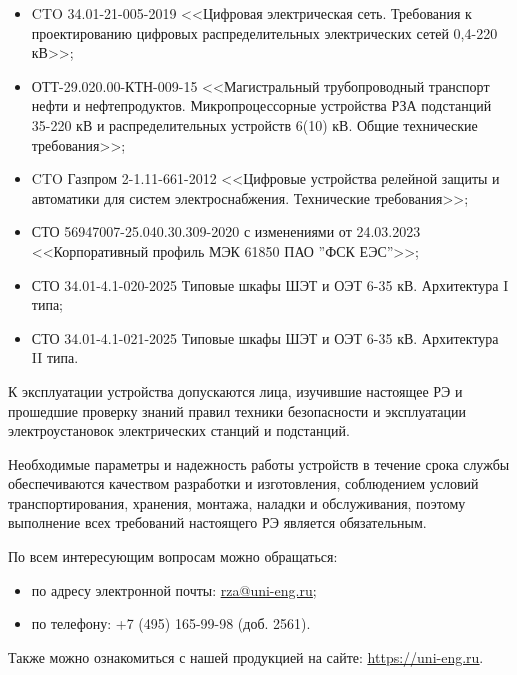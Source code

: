 \begin{itemize}
\item CTO 34.01-21-005-2019 <<Цифровая электрическая сеть. Требования к проектированию цифровых распределительных электрических сетей 0,4-220 кВ>>;
\item \sloppy ОТТ-29.020.00-КТН-009-15 <<Магистральный трубопроводный транспорт нефти и нефтепродуктов. Микропроцессорные устройства РЗА подстанций 35-220 кВ и распределительных устройств 6(10) кВ. Общие технические требования>>;
\item CTO Газпром 2-1.11-661-2012 <<Цифровые устройства релейной защиты и автоматики для систем электроснабжения. Технические требования>>;
\item СТО 56947007-25.040.30.309-2020 с изменениями от 24.03.2023 <<Корпоративный профиль МЭК 61850 ПАО ''ФСК ЕЭС''>>;
\item СТО 34.01-4.1-020-2025 Типовые шкафы ШЭТ и ОЭТ 6-35 кВ. Архитектура I типа;
\item СТО 34.01-4.1-021-2025 Типовые шкафы ШЭТ и ОЭТ 6-35 кВ. Архитектура II типа.

\end{itemize}

\par
К эксплуатации устройства допускаются лица, изучившие настоящее РЭ и прошедшие проверку знаний правил техники безопасности и эксплуатации электроустановок электрических станций и подстанций.

\par
Необходимые параметры и надежность работы устройств в течение срока службы обеспечиваются качеством разработки и изготовления, соблюдением условий транспортирования, хранения, монтажа, наладки и обслуживания, поэтому выполнение всех требований настоящего РЭ является обязательным.
\par
По всем интересующим вопросам можно обращаться:
\begin{itemize}
\item по адресу электронной почты: \href{mailto:rza@uni-eng.ru}{\color{uniblue}\uline{rza@uni-eng.ru}};
\item по телефону: +7 (495) 165-99-98 (доб. 2561).
\end{itemize}
Также можно ознакомиться с нашей продукцией на сайте: \href{https://uni-eng.ru}{\color{uniblue}\uline{https://uni-eng.ru}}.

